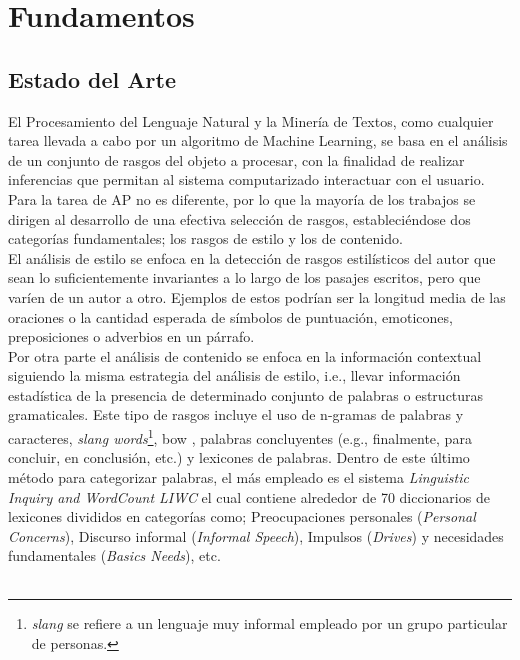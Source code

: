
\chapter{Fundamentos}

\section{Estado del Arte}\label{SOTA}

El Procesamiento del Lenguaje Natural y la Minería de Textos, como cualquier tarea llevada a cabo por un algoritmo de Machine Learning, se basa en el análisis de un conjunto de rasgos del objeto a procesar, con la finalidad de realizar inferencias que permitan al sistema computarizado interactuar con el usuario.
\\
Para la tarea de  AP no es diferente, por lo que la mayoría de los trabajos se dirigen al desarrollo de una efectiva selección de rasgos, estableciéndose dos categorías fundamentales; los rasgos de estilo y los de contenido.  
\\
El análisis de estilo se enfoca en la detección de rasgos estilísticos del autor que sean lo suficientemente invariantes a lo largo de los pasajes escritos, pero que varíen de un autor a otro. Ejemplos de estos podrían ser la longitud media de las oraciones o la cantidad esperada de símbolos de puntuación, emoticones, preposiciones o  adverbios en un párrafo.
\\
Por otra parte el análisis de contenido se enfoca en la información contextual siguiendo la misma estrategia del análisis de estilo, i.e., llevar información estadística de la presencia de determinado conjunto de palabras o estructuras gramaticales. Este tipo de rasgos incluye el uso de n-gramas de palabras y caracteres, \textit{slang words}\footnote{ \textit{slang} se refiere a un lenguaje muy informal empleado por un grupo particular de personas.}, \ac{bow} \citep{DBLP:conf/clef/Pizarro19,DBLP:conf/clef/Valencia-Valencia19}, palabras concluyentes (e.g., finalmente, para concluir, en conclusión, etc.)  y lexicones de palabras.
Dentro de este último método para categorizar palabras, el más empleado es el sistema \textit{Linguistic Inquiry and WordCount LIWC} \citep{pennebaker2015development} el cual contiene alrededor de 70 diccionarios de lexicones divididos en categorías como; Preocupaciones personales (\textit{Personal Concerns}), Discurso informal (\textit{Informal Speech}), Impulsos (\textit{Drives}) y necesidades fundamentales (\textit{Basics Needs}), etc.
\\\\

